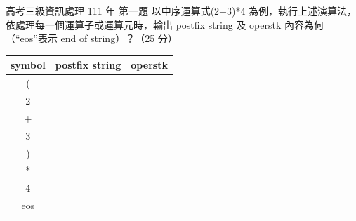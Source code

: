 \begin{pastexam}[label={px:gk3-111-ds-01}]{高考三級資訊處理 111 年 第一題}
以中序運算式(2+3)*4 為例，執行上述演算法，依處理每一個運算子或運算元時，輸出 postfix string 及
operstk 內容為何（“eos”表示 end of string）？（25 分）
\begin{center}
\begin{tabular}{ccc}
\toprule
symbol & \qquad postfix string \qquad & \qquad operstk \qquad \\
\midrule
( & & \\
2 & & \\
+ & & \\
3 & & \\
) & & \\
* & & \\
4 & & \\
eos & & \\
\bottomrule
\end{tabular}
\end{center}
\end{pastexam}

